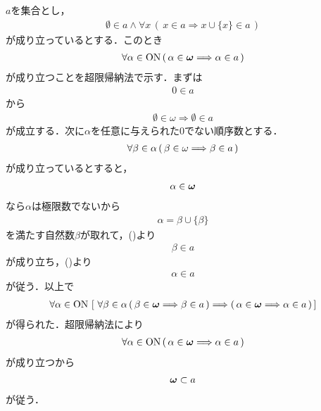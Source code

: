 	\begin{prf}
		$a$を集合とし，
		\begin{align}
			\emptyset \in a \wedge \forall x\, 
			(\, x \in a \Longrightarrow x \cup \{x\} \in a\, )
			\label{fom:thm_the_principle_of_mathematical_induction_1}
		\end{align}
		が成り立っているとする．このとき
		\begin{align}
			\forall \alpha \in \mathrm{ON}\, (\, \alpha \in {\boldsymbol \omega} \Longrightarrow \alpha \in a\, )
		\end{align}
		が成り立つことを超限帰納法で示す．まずは
		\begin{align}
			0 \in a
		\end{align}
		から
		\begin{align}
			\emptyset \in \omega \Longrightarrow \emptyset \in a
		\end{align}
		が成立する．次に$\alpha$を任意に与えられた$0$でない順序数とする．
		\begin{align}
			\forall \beta \in \alpha\, (\, \beta \in {\bf \omega} \Longrightarrow \beta \in a\, )
			\label{fom:thm_the_principle_of_mathematical_induction_2}
		\end{align}
		が成り立っているとすると，
		\begin{align}
			\alpha \in {\boldsymbol \omega}
		\end{align}
		なら$\alpha$は極限数でないから
		\begin{align}
			\alpha = \beta \cup \{\beta\}
		\end{align}
		を満たす自然数$\beta$が取れて，()より
		\begin{align}
			\beta \in a
		\end{align}
		が成り立ち，()より
		\begin{align}
			\alpha \in a
		\end{align}
		が従う．以上で
		\begin{align}
			\forall \alpha \in \ON\, \left[\ 
				\forall \beta \in \alpha\, (\, \beta \in \Natural \Longrightarrow \beta \in a\, )
				\Longrightarrow (\, \alpha \in \Natural \Longrightarrow \alpha \in a\, )\, \right]
		\end{align}
		が得られた．超限帰納法により
		\begin{align}
			\forall \alpha \in \mathrm{ON}\, (\, \alpha \in {\boldsymbol \omega} \Longrightarrow \alpha \in a\, )
		\end{align}
		が成り立つから
		\begin{align}
			{\boldsymbol \omega} \subset a
		\end{align}
		が従う．
		\QED
	\end{prf}